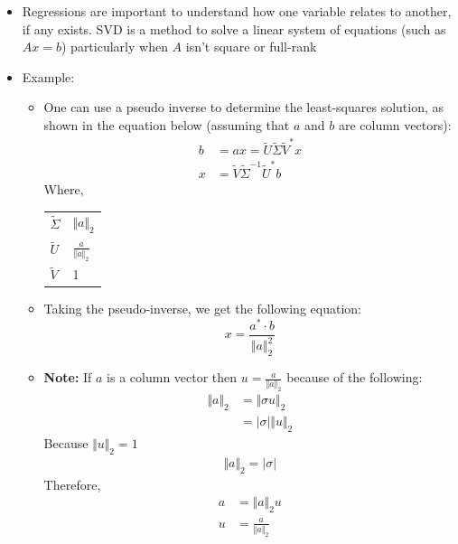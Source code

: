 \documentclass[11.5pt,a4paper]{article}
\makeatletter
\newenvironment{conditions}
  {\par\vspace{\abovedisplayskip}\noindent\begin{tabular}{>{$}l<{$} @{${}={}$} l}}
  {\end{tabular}\par\vspace{\belowdisplayskip}}
\makeatother
\begin{document}
\begin{itemize}
    \item Regressions are important to understand how one variable relates to another, if any exists. SVD is a method to solve a linear system of equations (such as $Ax=b$) particularly when $A$ isn't square or full-rank
    \item Example:
    \begin{itemize}
        \item One can use a pseudo inverse to determine the least-squares solution, as shown in the equation below (assuming that $a$ and $b$ are column vectors):
        \begin{align*}
            b &= ax = \tilde{U}\tilde{\Sigma}\tilde{V}^*x \\
            x &= \tilde{V}\tilde{\Sigma}^{-1}\tilde{U}^*b
        \end{align*}
        Where,
        \begin{conditions}
            \tilde{\Sigma} & $\Vert a \Vert_2$ \\
            \tilde{U} & $\frac{a}{\Vert a \Vert_2}$ \\
            \tilde{V} & 1
        \end{conditions}
        \item Taking the pseudo-inverse, we get the following equation:
        \begin{equation*}
            x = \frac{a^*\cdot b}{\Vert a \Vert_2^2}
        \end{equation*}
        \item \textbf{Note:} If $a$ is a column vector then $u = \frac{a}{\Vert a \Vert_2}$ because of the following:
        \begin{align*}
            \Vert a \Vert_2 &= \Vert \sigma u \Vert_2 \\
            &= |\sigma| \Vert u \Vert_2
        \end{align*}
        Because $\Vert u \Vert_2 = 1$
        \begin{align*}
            \Vert a \Vert_2 = |\sigma|
        \end{align*}
        Therefore,
        \begin{align*}
            a &= \Vert a \Vert_2 u \\
            u &= \frac{a}{\Vert a \Vert_2}
        \end{align*}
    \end{itemize}
\end{itemize}
\end{document}
